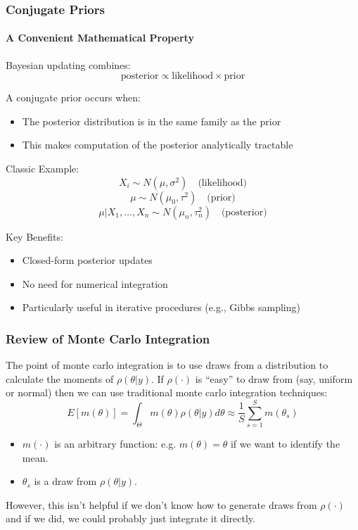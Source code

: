 \documentclass[11pt, aspectratio=169]{beamer}
\begin{document}
\begin{frame}[c]\frametitle{Conjugate Priors}
  \framesubtitle{A Convenient Mathematical Property}
  
  Bayesian updating combines:
  $$ \text{posterior} \propto \text{likelihood} \times \text{prior} $$
  
  A conjugate prior occurs when:
  \begin{itemize}
  \item The posterior distribution is in the same family as the prior
  \item This makes computation of the posterior analytically tractable
  \end{itemize}
  
  \vspace{0.5em}
  Classic Example:
  $$ X_i \sim N(\mu, \sigma^2) \quad \text{(likelihood)} $$
  $$ \mu \sim N(\mu_0, \tau^2) \quad \text{(prior)} $$
  $$ \mu|X_1,\ldots,X_n \sim N(\mu_n, \tau_n^2) \quad \text{(posterior)} $$
  
  \vspace{0.5em}
  Key Benefits:
  \begin{itemize}
  \item Closed-form posterior updates
  \item No need for numerical integration
  \item Particularly useful in iterative procedures (e.g., Gibbs sampling)
  \end{itemize}
  \end{frame}





\begin{frame}[c]\frametitle{Review of Monte Carlo Integration}
    
The point of monte carlo integration is to use draws from a distribution to calculate the moments of $\rho(\theta|y)$. If $\rho(\cdot)$ is ``easy'' to draw from (say, uniform or normal) then we can use traditional monte carlo integration techniques: 
$$E[m(\theta)] = \int_\Theta m(\theta) \rho(\theta|y) d\theta \approx \frac{1}{S} \sum_{s=1}^S m(\theta_s)$$
\begin{itemize}
\item $m(\cdot)$ is an arbitrary function: e.g. $m(\theta)=\theta$ if we  want to identify the mean.  
\item $\theta_s$ is a draw from $\rho(\theta|y)$. 
\end{itemize}

However, this isn't helpful if we don't know how to generate draws from $\rho(\cdot)$ and if we did, we could probably just integrate it directly. 


\end{frame}
\end{document}
